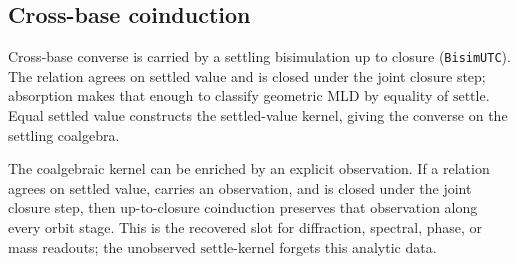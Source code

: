 \subsection{Cross-base coinduction}

\begin{theorem}\label{thm:coalgebraic-crossbase-mld}\leanok{}
Cross-base converse is carried by a settling bisimulation up to closure
(\texttt{BisimUTC}).  The relation agrees on settled value and is closed under
the joint closure step; absorption makes that enough to classify geometric MLD
by equality of \(\mathrm{settle}\).  Equal settled value constructs the
settled-value kernel, giving the converse on the settling coalgebra.
\end{theorem}

\begin{theorem}\label{thm:observed-upto-closure-coinduction}\leanok{}
The coalgebraic kernel can be enriched by an explicit observation.  If a
relation agrees on settled value, carries an observation, and is closed under
the joint closure step, then up-to-closure coinduction preserves that
observation along every orbit stage.  This is the recovered slot for
diffraction, spectral, phase, or mass readouts; the unobserved
\(\mathrm{settle}\)-kernel forgets this analytic data.
\end{theorem}
